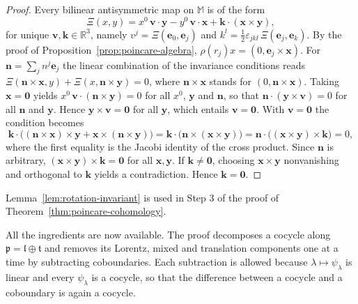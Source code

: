 \begin{proof}
	Every bilinear antisymmetric map on $\mathbb{M}$ is of the form
	\begin{equation*}
		\Xi(x,y)=x^0\,\mathbf{v}\cdot\mathbf{y}-y^0\,\mathbf{v}\cdot\mathbf{x}+\mathbf{k}\cdot(\mathbf{x}\times\mathbf{y}),
	\end{equation*}
	for unique $\mathbf{v},\mathbf{k}\in\mathbb{R}^3$, namely $v^j=\Xi(\mathbf{e}_0,\mathbf{e}_j)$ and $k^l=\tfrac12\varepsilon_{jkl}\,\Xi(\mathbf{e}_j,\mathbf{e}_k)$. By the proof of Proposition~\ref{prop:poincare-algebra}, $\rho(r_j)x=(0,\mathbf{e}_j\times\mathbf{x})$. For $\mathbf{n}=\sum_jn^j\mathbf{e}_j$ the linear combination of the invariance conditions reads $\Xi(\mathbf{n}\times\mathbf{x},y)+\Xi(x,\mathbf{n}\times\mathbf{y})=0$, where $\mathbf{n}\times\mathbf{x}$ stands for $(0,\mathbf{n}\times\mathbf{x})$. Taking $\mathbf{x}=\mathbf{0}$ yields $x^0\,\mathbf{v}\cdot(\mathbf{n}\times\mathbf{y})=0$ for all $x^0$, $\mathbf{y}$ and $\mathbf{n}$, so that $\mathbf{n}\cdot(\mathbf{y}\times\mathbf{v})=0$ for all $\mathbf{n}$ and $\mathbf{y}$. Hence $\mathbf{y}\times\mathbf{v}=\mathbf{0}$ for all $\mathbf{y}$, which entails $\mathbf{v}=\mathbf{0}$. With $\mathbf{v}=\mathbf{0}$ the condition becomes
	\begin{equation*}
		\mathbf{k}\cdot\big((\mathbf{n}\times\mathbf{x})\times\mathbf{y}+\mathbf{x}\times(\mathbf{n}\times\mathbf{y})\big)=\mathbf{k}\cdot\big(\mathbf{n}\times(\mathbf{x}\times\mathbf{y})\big)=\mathbf{n}\cdot\big((\mathbf{x}\times\mathbf{y})\times\mathbf{k}\big)=0,
	\end{equation*}
	where the first equality is the Jacobi identity of the cross product. Since $\mathbf{n}$ is arbitrary, $(\mathbf{x}\times\mathbf{y})\times\mathbf{k}=\mathbf{0}$ for all $\mathbf{x},\mathbf{y}$. If $\mathbf{k}\neq\mathbf{0}$, choosing $\mathbf{x}\times\mathbf{y}$ nonvanishing and orthogonal to $\mathbf{k}$ yields a contradiction. Hence $\mathbf{k}=\mathbf{0}$.
\end{proof}

\noindent Lemma~\ref{lem:rotation-invariant} is used in Step 3 of the proof of Theorem~\ref{thm:poincare-cohomology}.

All the ingredients are now available. The proof decomposes a cocycle along $\mathfrak{p}=\mathfrak{l}\oplus\mathfrak{t}$ and removes its Lorentz, mixed and translation components one at a time by subtracting coboundaries. Each subtraction is allowed because $\lambda\mapsto\psi_\lambda$ is linear and every $\psi_\lambda$ is a cocycle, so that the difference between a cocycle and a coboundary is again a cocycle.

